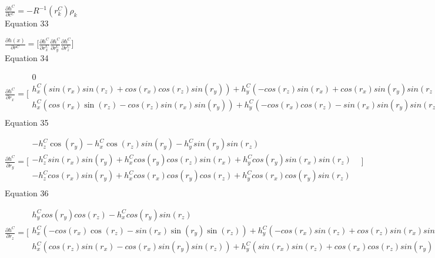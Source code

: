 $\frac{\partial h^{C}}{\partial c^{C}}=-R^{-1}(r_{k}^{C})\rho _{k}$\\


Equation 33

$\frac{\partial h(x)}{\partial r^{C}}=\lbrack \frac{\partial 
h^{C}}{\partial r_{x}^{C}}\frac{\partial h^{C}}{\partial 
r_{y}^{C}}\frac{\partial h^{C}}{\partial r_{z}^{C}}\rbrack $\\


Equation 34

$\frac{\partial h^{C}}{\partial r_{x}}=\lbrack \begin{matrix}
0 & \\

h_{x}^{C}(sin(r_{x})sin(r_{z})+cos(r_{x})cos(r_{z})sin(r_{y}))+h_{y}^{C}(-cos(r_{z})sin(r_{x})+cos(r_{x})sin(r_{y})sin(r_{z})) 
+ h_{z}^{C}cos(r_{x})cos(r_{y}) & \\
h_{x}^{C}(cos(r_{x})\sin 
(r_{z})-cos(r_{z})sin(r_{x})sin(r_{y}))+h_{y}^{C}(-cos(r_{x})cos(r_{z})-sin(r_{x})sin(r_{y})sin(r_{z})) 
- h_{z}^{C}cos(r_{y})sin(r_{x}) & \\
\end{matrix}
\rbrack $\\


Equation 35

$\frac{\partial h^{C}}{\partial r_{y}}=\lbrack \begin{matrix}
-h_{z}^{C}\cos (r_{y})- h_{x}^{C}\cos (r_{z})sin(r_{y})- 
h_{y}^{C}sin(r_{y})sin(r_{z}) & \\

-h_{z}^{C}sin(r_{x})sin(r_{y})+h_{x}^{C}cos(r_{y})cos(r_{z})sin(r_{x})+h_{y}^{C}cos(r_{y})sin(r_{x})sin(r_{z}) 
& \\

-h_{z}^{C}cos(r_{x})sin(r_{y})+h_{x}^{C}cos(r_{x})cos(r_{y})cos(r_{z})+h_{y}^{C}cos(r_{x})cos(r_{y})sin(r_{z}) 
& \\
\end{matrix}
\rbrack $\\


Equation 36

$\frac{\partial h^{C}}{\partial r_{z}}=\lbrack \begin{matrix}
h_{y}^{C}cos(r_{y})cos(r_{z})-h_{x}^{C}cos(r_{y})sin(r_{z}) & \\
h_{x}^{C}(-cos(r_{x})\cos (r_{z})- sin(r_{x})\sin (r_{y})\sin (r_{z}))+ 
h_{y}^{C}(-cos(r_{x})sin(r_{z})+cos(r_{z})sin(r_{x})sin(r_{y})) & \\

h_{x}^{C}(cos(r_{z})sin(r_{x})-cos(r_{x})sin(r_{y})sin(r_{z}))+h_{y}^{C}(sin(r_{x})sin(r_{z})+cos(r_{x})cos(r_{z})sin(r_{y})) 
& \\
\end{matrix}
\rbrack $\\


